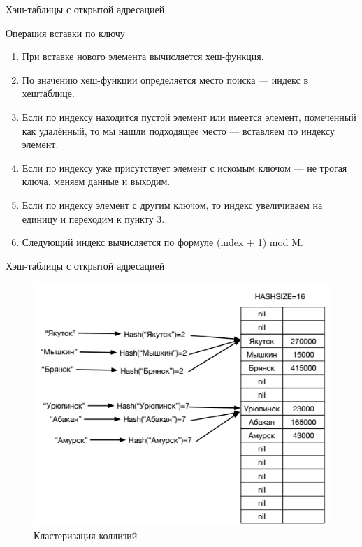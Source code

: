 \documentclass{beamer}
\begin{document}
\begin{frame}{Хэш-таблицы с открытой адресацией}
    \begin{block}{Операция вставки по ключу}
        \begin{enumerate}
            \item При вставке нового элемента вычисляется хеш-функция.
            \item По значению хеш-функции определяется место поиска — индекс в хештаблице.
            \item Если по индексу находится пустой элемент или имеется элемент, помеченный как удалённый, то мы нашли подходящее место — вставляем по индексу элемент.
            \item Если по индексу уже присутствует элемент с искомым ключом — не трогая ключа, меняем данные и выходим.
            \item Если по индексу элемент с другим ключом, то индекс увеличиваем на единицу и переходим к пункту 3.
            \item Следующий индекс вычисляется по формуле (index + 1) mod M.
        \end{enumerate}
    \end{block}
\end{frame} 

\begin{frame}{Хэш-таблицы с открытой адресацией}
    \begin{figure}[h]
		\centering
		\includegraphics[scale=0.6]{images/lec08-pic16.png}
		\caption{Кластеризация коллизий}
	\end{figure}
\end{frame}
\end{document}
